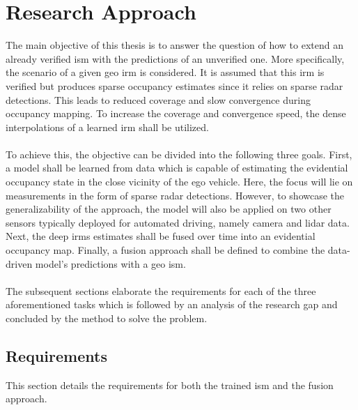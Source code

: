 \chapter{Research Approach}
\label{ch:research_approach}
The main objective of this thesis is to answer the question of how to extend an already verified \gls{ism} with the predictions of an unverified one. More specifically, the scenario of a given geo \gls{irm} is considered. It is assumed that this \gls{irm} is verified but produces sparse occupancy estimates since it relies on sparse radar detections. This leads to reduced coverage and slow convergence during occupancy mapping. To increase the coverage and convergence speed, the dense interpolations of a learned \gls{irm} shall be utilized.
\\\\
To achieve this, the objective can be divided into the following three goals. First, a model shall be learned from data which is capable of estimating the evidential occupancy state in the close vicinity of the ego vehicle. Here, the focus will lie on measurements in the form of sparse radar detections. However, to showcase the generalizability of the approach, the model will also be applied on two other sensors typically deployed for automated driving, namely camera and lidar data. Next, the deep \gls{irm}s estimates shall be fused over time into an evidential occupancy map. Finally, a fusion approach shall be defined to combine the data-driven model's predictions with a geo \gls{ism}.
\\\\
The subsequent sections elaborate the requirements for each of the three aforementioned tasks which is followed by an analysis of the research gap and concluded by the method to solve the problem. 
%
\section{Requirements}
\label{sec:requirements}
This section details the requirements for both the trained \gls{ism} and the fusion approach.
%
